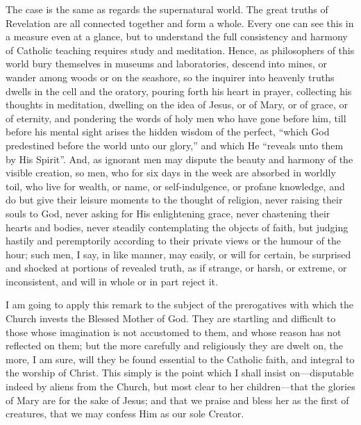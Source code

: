 The case is the same as regards the supernatural world. The great
truths of Revelation are all connected together and form a whole.
Every one can see this in a measure even at a glance, but to
understand the full consistency and harmony of Catholic teaching
requires study and meditation. Hence, as philosophers of this world
bury themselves in museums and laboratories, descend into mines, or
wander among woods or on the seashore, so the inquirer into heavenly
truths dwells in the cell and the oratory, pouring forth his heart in
prayer, collecting his thoughts in meditation, dwelling on the idea of
Jesus, or of Mary, or of grace, or of eternity, and pondering the
words of holy men who have gone before him, till before his mental
sight arises the hidden wisdom of the perfect, ``which God
predestined before the world unto our glory,'' and which He
``reveals unto them by His Spirit''. And, as ignorant men may
dispute the beauty and harmony of the visible creation, so men, who
for six days in the week are absorbed in worldly toil, who live for
wealth, or name, or self-indulgence, or profane knowledge, and do but
give their leisure moments to the thought of religion, never raising
their souls to God, never asking for His enlightening grace, never
chastening their hearts and bodies, never steadily contemplating the
objects of faith, but judging hastily and peremptorily according to
their private views or the humour of the hour; such men, I say, in
like manner, may easily, or will for certain, be surprised and shocked
at portions of revealed truth, as if strange, or harsh, or extreme, or
inconsistent, and will in whole or in part reject it.

I am going to apply this remark to the subject of the prerogatives
with which the Church invests the Blessed Mother of God. They are
startling and difficult to those whose imagination is not accustomed
to them, and whose reason has not reflected on them; but the more
carefully and religiously they are dwelt on, the more, I am sure, will
they be found essential to the Catholic faith, and integral to the
worship of Christ. This simply is the point which I shall insist on—disputable
indeed by aliens from the Church, but most clear to her children—that
the glories of Mary are for the sake of Jesus; and that we praise and
bless her as the first of creatures, that we may confess Him as our
sole Creator.

